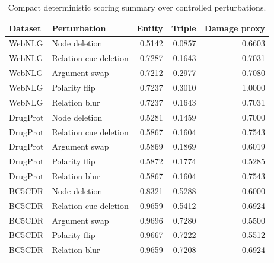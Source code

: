 \begin{table}[t]
\centering
\caption{Compact deterministic scoring summary over controlled perturbations.}
\label{tab:scoring-final}
\scriptsize
\begin{tabular}{llrrr}
\toprule
Dataset & Perturbation & Entity & Triple & Damage proxy \\
\midrule
WebNLG & Node deletion & 0.5142 & 0.0857 & 0.6603 \\
WebNLG & Relation cue deletion & 0.7287 & 0.1643 & 0.7031 \\
WebNLG & Argument swap & 0.7212 & 0.2977 & 0.7080 \\
WebNLG & Polarity flip & 0.7237 & 0.3010 & 1.0000 \\
WebNLG & Relation blur & 0.7237 & 0.1643 & 0.7031 \\
DrugProt & Node deletion & 0.5281 & 0.1459 & 0.7000 \\
DrugProt & Relation cue deletion & 0.5867 & 0.1604 & 0.7543 \\
DrugProt & Argument swap & 0.5869 & 0.1869 & 0.6019 \\
DrugProt & Polarity flip & 0.5872 & 0.1774 & 0.5285 \\
DrugProt & Relation blur & 0.5867 & 0.1604 & 0.7543 \\
BC5CDR & Node deletion & 0.8321 & 0.5288 & 0.6000 \\
BC5CDR & Relation cue deletion & 0.9659 & 0.5412 & 0.6924 \\
BC5CDR & Argument swap & 0.9696 & 0.7280 & 0.5500 \\
BC5CDR & Polarity flip & 0.9667 & 0.7222 & 0.5512 \\
BC5CDR & Relation blur & 0.9659 & 0.7208 & 0.6924 \\
\bottomrule
\end{tabular}
\end{table}
